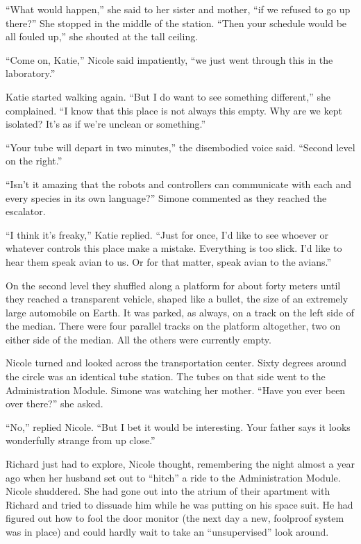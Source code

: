 \documentclass[]{article}
\begin{document}
{“What would happen,” she said to her sister and mother, “if we refused to go up there?” She stopped in the middle of the station. “Then your schedule would be all fouled up,” she shouted at the tall ceiling.

“Come on, Katie,” Nicole said impatiently, “we just went through this in the laboratory.”

Katie started walking again. “But I do want to see something different,” she complained. “I know that this place is not always this empty. Why are we kept isolated? It’s as if we’re unclean or something.”

“Your tube will depart in two minutes,” the disembodied voice said. “Second level on the right.”

“Isn’t it amazing that the robots and controllers can communicate with each and every species in its own language?” Simone commented as they reached the escalator.

“I think it’s freaky,” Katie replied. “Just for once, I’d like to see whoever or whatever controls this place make a mistake. Everything is too slick. I’d like to hear them speak avian to us. Or for that matter, speak avian to the avians.”

On the second level they shuffled along a platform for about forty meters until they reached a transparent vehicle, shaped like a bullet, the size of an extremely large automobile on Earth. It was parked, as always, on a track on the left side of the median. There were four parallel tracks on the platform altogether, two on either side of the median. All the others were currently empty.

Nicole turned and looked across the transportation center. Sixty degrees around the circle was an identical tube station. The tubes on that side went to the Administration Module. Simone was watching her mother. “Have you ever been over there?” she asked.

“No,” replied Nicole. “But I bet it would be interesting. Your father says it looks wonderfully strange from up close.”

Richard just had to explore, Nicole thought, remembering the night almost a year ago when her husband set out to “hitch” a ride to the Administration Module. Nicole shuddered. She had gone out into the atrium of their apartment with Richard and tried to dissuade him while he was putting on his space suit. He had figured out how to fool the door monitor (the next day a new, foolproof system was in place) and could hardly wait to take an “unsupervised” look around.

}
\end{document}
